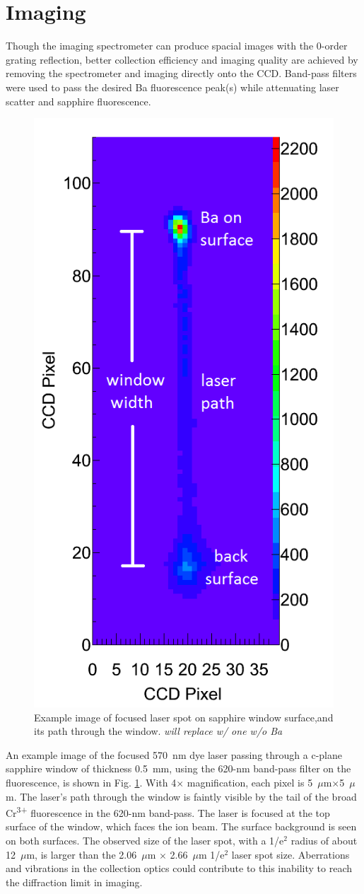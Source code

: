 \section{Imaging}
\label{imaging}

Though the imaging spectrometer can produce spacial images with the 0-order grating reflection, better collection efficiency and imaging quality are achieved by removing the spectrometer and imaging directly onto the CCD.  Band-pass filters were used to pass the desired Ba fluorescence peak(s) while attenuating laser scatter and sapphire fluorescence.

\begin{figure} %
        \centering
                \includegraphics[width=.4\textwidth]{figures/raw_14-atom_labels_from_paper_1f.png}
                \caption{Example image of focused laser spot on sapphire window surface,and its path through the window.  \emph{\color{red}will replace w/ one w/o Ba}}
\label{fig:imageexamp}
\end{figure}

An example image of the focused 570~nm dye laser passing through a c-plane sapphire window of thickness 0.5~mm, using the 620-nm band-pass filter on the fluorescence, is shown in Fig. \ref{fig:imageexamp}.  With 4$\times$ magnification, each pixel is 5~$\mu$m$\times$5~$\mu$m.  The laser's path through the window is faintly visible by the tail of the broad Cr\textsuperscript{3+} fluorescence in the 620-nm band-pass.  The laser is focused at the top surface of the window, which faces the ion beam.  The surface background is seen on both surfaces.  The observed size of the laser spot, with a 1/e$^{2}$ radius of about 12~$\mu$m, is larger than the 2.06~$\mu$m $\times$ 2.66~$\mu$m 1/e$^{2}$ laser spot size.  Aberrations and vibrations in the collection optics could contribute to this inability to reach the diffraction limit in imaging.

